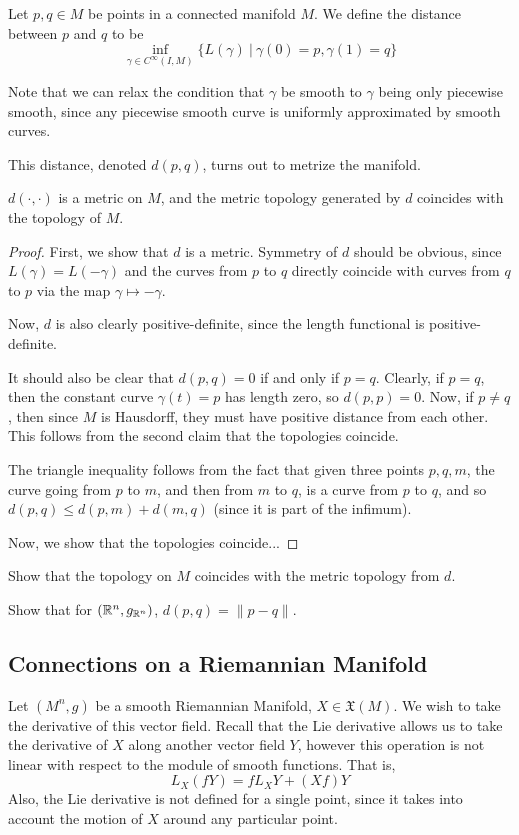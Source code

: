 \documentclass[../main.tex]{subfiles}
\begin{document}
\begin{defn}
    Let $p,q\in M$ be points in a connected manifold $M$. We define the distance
    between $p$ and $q$ to be
    \[
        \inf_{\gamma\in C^{\infty}(I,M)}\{L(\gamma)\ |\ \gamma(0)=p,\gamma(1)=q\}
    \]
\end{defn}
Note that we can relax the condition that $\gamma$ be smooth to $\gamma$ being
only piecewise smooth, since any piecewise smooth curve is uniformly
approximated by smooth curves.

This distance, denoted $d(p,q)$, turns out to metrize the manifold.
\begin{theorem}
    $d(\cdot,\cdot)$ is a metric on $M$, and the metric topology generated by
    $d$ coincides with the topology of $M$.
\end{theorem}

\begin{proof}
    First, we show that $d$ is a metric. Symmetry of $d$ should be obvious,
    since $L(\gamma)=L(-\gamma)$ and the curves from $p$ to $q$ directly
    coincide with curves from $q$ to $p$ via the map $\gamma\mapsto-\gamma$. 

    Now, $d$ is also clearly positive-definite, since the length functional is
    positive-definite.

    It should also be clear that $d(p,q)=0$ if and only if $p=q$. Clearly, if
    $p=q$, then the constant curve $\gamma(t)=p$ has length zero, so $d(p,p) =
    0$. Now, if $p\neq q$, then since $M$ is Hausdorff, they must have positive
    distance from each other. This follows from the second claim that the
    topologies coincide.

    The triangle inequality follows from the fact that given three points
    $p,q,m$, the curve going from $p$ to $m$, and then from $m$ to $q$, is a
    curve from $p$ to $q$, and so $d(p,q)\leq d(p,m)+d(m,q)$ (since it is part
    of the infimum).

    Now, we show that the topologies coincide...
\end{proof}
\begin{hw}
Show that the topology on $M$ coincides with the metric topology from $d$.
\end{hw}

\begin{hw}
    Show that for $(\mathbb{R}^n,g_{\mathbb{R}^n})$, $d(p,q) = \|p-q\|$.
\end{hw}

\subsection{Connections on a Riemannian Manifold}
Let $(M^n,g)$ be a smooth Riemannian Manifold, $X\in\mathfrak{X}(M)$. We wish to
take the derivative of this vector field. Recall that the Lie derivative allows
us to take the derivative of $X$ along another vector field $Y$, however this
operation is not linear with respect to the module of smooth functions. That is,
\[
    L_X(fY) = fL_XY + (Xf)Y
\]
Also, the Lie derivative is not defined for a single point, since it takes into
account the motion of $X$ around any particular point.
\end{document}
